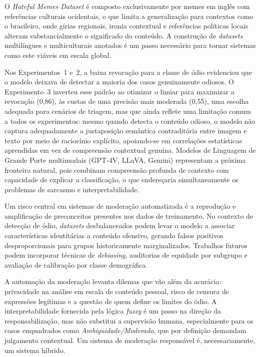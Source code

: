 O \textit{Hateful Memes Dataset} é composto exclusivamente por memes em inglês com referências culturais ocidentais, o que limita a generalização para contextos como o brasileiro, onde gírias regionais, ironia contextual e referências políticas locais alteram substancialmente o significado do conteúdo. A construção de \textit{datasets} multilíngues e multiculturais anotados é um passo necessário para tornar sistemas como este viáveis em escala global.

Nos Experimentos~1 e~2, a baixa revocação para a classe de ódio evidenciou que o modelo deixava de detectar a maioria dos casos genuinamente odiosos. O Experimento~3 inverteu esse padrão ao otimizar o limiar para maximizar a revocação (0,86), às custas de uma precisão mais moderada (0,55), uma escolha adequada para cenários de triagem, mas que ainda reflete uma limitação comum a todos os experimentos: mesmo quando detecta o conteúdo odioso, o modelo não captura adequadamente a justaposição semântica contraditória entre imagem e texto por meio de raciocínio explícito, apoiando-se em correlações estatísticas aprendidas em vez de compreensão contextual genuína. Modelos de Linguagem de Grande Porte multimodais (GPT-4V, LLaVA, Gemini) representam a próxima fronteira natural, pois combinam compreensão profunda de contexto com capacidade de explicar a classificação, o que endereçaria simultaneamente os problemas de sarcasmo e interpretabilidade.

Um risco central em sistemas de moderação automatizada é a reprodução e amplificação de preconceitos presentes nos dados de treinamento. No contexto de detecção de ódio, \textit{datasets} desbalanceados podem levar o modelo a associar características identitárias a conteúdo ofensivo, gerando falsos positivos desproporcionais para grupos historicamente marginalizados. Trabalhos futuros podem incorporar técnicas de \textit{debiasing}, auditorias de equidade por subgrupo e avaliação de calibração por classe demográfica.

A automação da moderação levanta dilemas que vão além da acurácia: privacidade na análise em escala de conteúdo pessoal, risco de censura de expressões legítimas e a questão de quem define os limites do ódio. A interpretabilidade fornecida pela lógica \textit{fuzzy} é um passo na direção da responsabilização, mas não substitui a supervisão humana, especialmente para os casos enquadrados como \textit{Ambiguidade/Moderado}, que por definição demandam julgamento contextual. Um sistema de moderação responsável é, necessariamente, um sistema híbrido.
